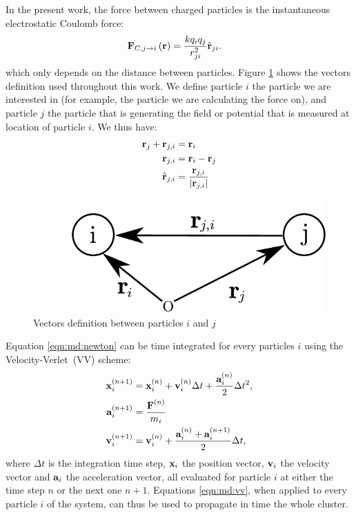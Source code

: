 %
%
In the present work, the force between charged particles is the instantaneous
electrostatic Coulomb force:
\begin{align}
\textbf{F}_{C,j \rightarrow i}\left( \textbf{r} \right) & =\frac{k q_i q_j}{r_{ji}^2} \hat{\textbf{r}}_{ji}.
\label{eqn:md:coulomb:F}
\end{align}
which only depends on the distance between particles. Figure
\ref{fig:md:vectors} shows the vectors definition used throughout this work. We
define particle $i$ the particle we are interested in (for example, the
particle we are calculating the force on), and particle $j$ the particle that
is generating the field or potential that is measured at location of particle
$i$. We thus have:
\begin{align}
\textbf{r}_{j} + \textbf{r}_{j,i} & = \textbf{r}_{i} \\
\textbf{r}_{j,i} & = \textbf{r}_{i} - \textbf{r}_{j} \\
\hat{\textbf{r}}_{j,i} & = \frac{\textbf{r}_{j,i}}{\left| \textbf{r}_{j,i} \right|}
\end{align}
%
\begin{figure}
 \centering
 \includegraphics[width=0.5\columnwidth]{figures/vectors}
 \caption{\label{fig:md:vectors}Vectors definition between particles $i$ and $j$}
\end{figure}
%
%
Equation \eqref{eqn:md:newton} can be time integrated for every particles
$i$ using the Velocity-Verlet~(VV) scheme:
\begin{subequations}
\label{eqn:md:vv}
\begin{align}
\textbf{x}_{i}^{\left( n+1 \right)} & = \textbf{x}_{i}^{\left( n \right)} + \textbf{v}_{i}^{\left( n \right)} \Delta t +
\frac{\textbf{a}_{i}^{\left( n \right)}}{2} \Delta t^2, \\
\textbf{a}_{i}^{\left( n+1 \right)} & = \frac{\textbf{F}^{\left( n \right)}}{m_i} \label{eqn:md:vv:a} \\
\textbf{v}_{i}^{\left( n+1 \right)} & = \textbf{v}_{i}^{\left( n \right)} + \frac{\textbf{a}_{i}^{\left( n \right)} +
\textbf{a}_{i}^{\left( n+1 \right)}}{2} \Delta t,
\end{align}
\end{subequations}
where $\Delta t$ is the integration time step, $\textbf{x}_{i}$ the position vector,
$\textbf{v}_{i}$ the velocity vector and $\textbf{a}_{i}$ the acceleration vector, all evaluated
for particle $i$ at either the time step $n$ or the next one $n+1$.
Equations \eqref{eqn:md:vv}, when applied to every 
particle
$i$ of the system,
can thus be used to propagate in time the whole cluster. 

